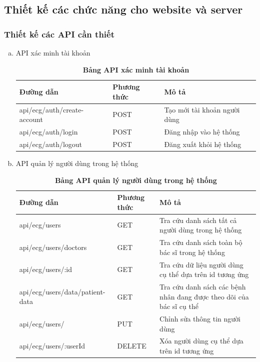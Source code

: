 \subsection{Thiết kế các chức năng cho website và server}

\subsubsection{Thiết kế các API cần thiết}


\begin{enumerate}[a)]
	\item API xác minh tài khoản

	\begin{xltabular}{\textwidth}{
	  | >{\raggedright\arraybackslash}m{4.6cm}
	  | >{\centering\arraybackslash}m{2.8cm}
	  | >{\raggedright\arraybackslash}X |
	  }
	  \caption{\bfseries \fontsize{12pt}{0pt}\selectfont Bảng API xác minh tài khoản}
	  \label{table_api_auth}
	  \\
	  \hline
	  \bfseries Đường dẫn    &\bfseries Phương thức    &\bfseries Mô tả\\ \hline
	  api/ecg/auth/create-account   &   POST  & Tạo mới tài khoản người dùng \\ \hline
	  api/ecg/auth/login   &    POST    & Đăng nhập vào hệ thống \\ \hline
	  api/ecg/auth/logout   &    POST    & Đăng xuất khỏi hệ thống \\ \hline
	\end{xltabular}
  
	\item API quản lý người dùng trong hệ thống
	\begin{xltabular}{\textwidth}{
	  | >{\raggedright\arraybackslash}m{4.6cm}
	  | >{\centering\arraybackslash}m{2.8cm}
	  | >{\raggedright\arraybackslash}X |
	  }
	  \caption{\bfseries \fontsize{12pt}{0pt}\selectfont Bảng API quản lý người dùng trong hệ thống}
	  \label{table_api_user}
	  \\
	  \hline
	  \bfseries Đường dẫn    &\bfseries Phương thức    &\bfseries Mô tả\\ \hline
	  api/ecg/users   &   GET  &  Tra cứu danh sách tất cả người dùng trong hệ thống\\  \hline
	  api/ecg/users/doctors   &   GET  &  Tra cứu danh sách toàn bộ bác sĩ trong hệ thống \\  \hline
	  api/ecg/users/:id   &   GET  &  Tra cứu dữ liệu người dùng cụ thể dựa trên id tương ứng \\  \hline
	  api/ecg/users/data/patient-data   &   GET  &  Tra cứu danh sách các bệnh nhân đang được theo dõi của bác sĩ cụ thể \\  \hline
	  api/ecg/users/   &   PUT  &  Chỉnh sửa thông tin người dùng \\  \hline
	  api/ecg/users/:userId  &   DELETE  &  Xóa người dùng cụ thể dựa trên id tương ứng \\  \hline
	\end{xltabular}
  

\end{enumerate}
